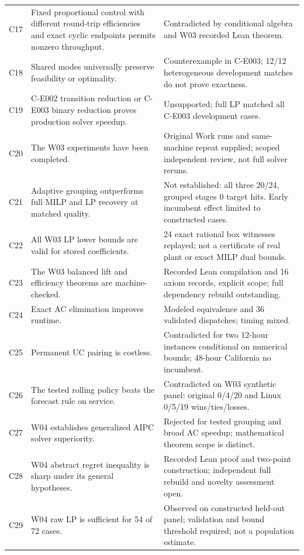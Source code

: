 \documentclass[11pt,letterpaper]{article}
\begin{document}
\begin{longtable}{P{.10\linewidth}P{.46\linewidth}P{.35\linewidth}}
C17 & Fixed proportional control with different round-trip efficiencies and exact cyclic endpoints permits nonzero throughput. & Contradicted by conditional algebra and W03 recorded Lean theorem.\\
C18 & Shared modes universally preserve feasibility or optimality. & Counterexample in C-E003; 12/12 heterogeneous development matches do not prove exactness.\\
C19 & C-E002 transition reduction or C-E003 binary reduction proves production solver speedup. & Unsupported; full LP matched all C-E003 development cases.\\
C20 & The W03 experiments have been completed. & Original Work runs and same-machine repeat supplied; scoped independent review, not full solver reruns.\\
C21 & Adaptive grouping outperforms full MILP and LP recovery at matched quality. & Not established: all three 20/24, grouped stages 0 target hits. Early incumbent effect limited to constructed cases.\\
C22 & All W03 LP lower bounds are valid for stored coefficients. & 24 exact rational box witnesses replayed; not a certificate of real plant or exact MILP dual bounds.\\
C23 & The W03 balanced lift and efficiency theorems are machine-checked. & Recorded Lean compilation and 16 axiom records, explicit scope; full dependency rebuild outstanding.\\
C24 & Exact AC elimination improves runtime. & Modeled equivalence and 36 validated dispatches; timing mixed.\\
C25 & Permanent UC pairing is costless. & Contradicted for two 12-hour instances conditional on numerical bounds; 48-hour California no incumbent.\\
C26 & The tested rolling policy beats the forecast rule on service. & Contradicted on W03 synthetic panel: original 0/4/20 and Linux 0/5/19 wins/ties/losses.\\
C27 & W04 establishes generalized AIPC solver superiority. & Rejected for tested grouping and broad AC speedup; mathematical theorem scope is distinct.\\
C28 & W04 abstract regret inequality is sharp under its general hypotheses. & Recorded Lean proof and two-point construction; independent full rebuild and novelty assessment open.\\
C29 & W04 raw LP is sufficient for 54 of 72 cases. & Observed on constructed held-out panel; validation and bound threshold required; not a population estimate.\\

\end{longtable}
\end{document}
